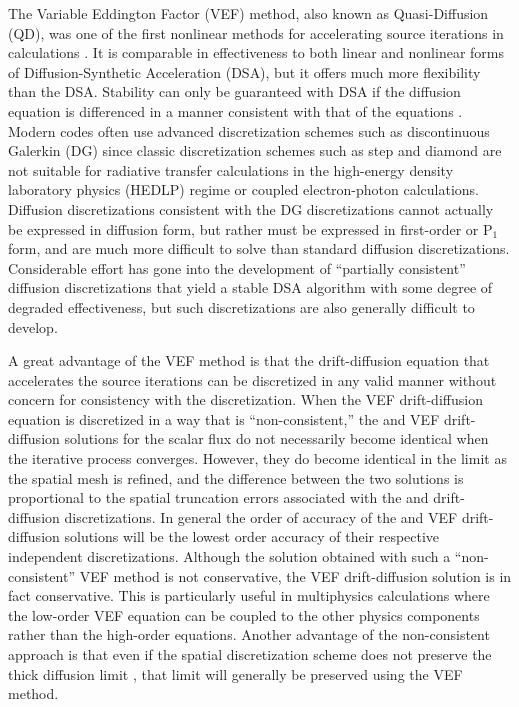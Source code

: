 The Variable Eddington Factor (VEF) method, also known as Quasi-Diffusion (QD), was one of the first nonlinear methods 
for accelerating source iterations in \SN calculations \cite{*}.  It is comparable in effectiveness to both linear 
and nonlinear forms of Diffusion-Synthetic Acceleration (DSA), but it offers much more flexibility than the DSA.   
Stability can only be guaranteed with DSA if the diffusion equation is differenced in a manner consistent with that 
of the \SN equations \cite{*}. Modern \SN codes often use advanced discretization schemes such as discontinuous 
Galerkin (DG) since classic discretization schemes such as step and diamond are not suitable for radiative transfer 
calculations in the high-energy density laboratory physics (HEDLP) regime or coupled electron-photon calculations.  Diffusion discretizations consistent 
with the DG \SN discretizations cannot actually be expressed in diffusion form, but rather must be expressed in 
first-order or P$_1$ form, and are much more difficult to solve than standard diffusion discretizations.   Considerable 
effort has gone into the development of ``partially consistent'' diffusion discretizations that yield a stable DSA 
algorithm with some degree of degraded effectiveness, but such discretizations are also generally difficult to develop. 

A 
great advantage of the VEF method is that the drift-diffusion equation that accelerates the \SN source iterations can be 
discretized in any valid manner without concern for consistency with the \SN discretization.  When the VEF 
drift-diffusion equation is discretized in a way that is ``non-consistent,'' the \SN and VEF drift-diffusion solutions 
for the scalar flux do not necessarily become identical when the iterative process converges.  However, they do become 
identical in the limit as the spatial mesh is refined, and the difference between the two solutions is proportional to 
the spatial truncation errors associated with the \SN and drift-diffusion discretizations.  In general the order of accuracy 
of the \SN and VEF drift-diffusion solutions will be the lowest order accuracy of their respective independent
discretizations.  Although the \SN solution obtained with such a ``non-consistent'' VEF method is not conservative, 
the VEF drift-diffusion solution is in fact conservative.  This is particularly useful in multiphysics calculations 
where the low-order VEF equation can be coupled to the other physics components rather than the high-order \SN 
equations.  Another advantage of the non-consistent approach is that even if the \SN spatial discretization 
scheme does not preserve the thick diffusion limit \cite{*}, that limit will generally be preserved using the VEF method. 
 
